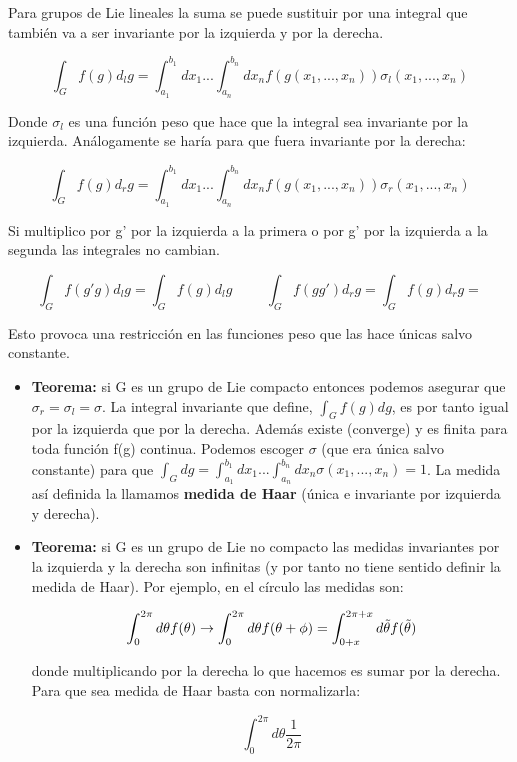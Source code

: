 \documentclass{article}
\begin{document}
     Para grupos de Lie lineales la suma se puede sustituir por una integral que también va a ser invariante por la izquierda y por la derecha.

     $$\int _G f(g)d_lg=\int ^{b_1}_{a_1} dx_1...\int ^{b_n}_{a_n} dx_n f(g(x_1,...,x_n))\sigma _l(x_1,...,x_n)$$

     Donde $\sigma _l$ es una función peso que hace que la integral sea invariante por la izquierda. Análogamente se haría para que fuera invariante por la derecha:

     $$\int _G f(g)d_rg=\int ^{b_1}_{a_1} dx_1...\int ^{b_n}_{a_n} dx_n f(g(x_1,...,x_n))\sigma _r(x_1,...,x_n)$$

     Si multiplico por g' por la izquierda a la primera o por g' por la izquierda a la segunda las integrales no cambian.

     $$\int _G f(g'g)d_lg=\int _G f(g)d_lg \hspace{1cm} \int _G f(gg')d_rg=\int _G f(g)d_rg=$$

     Esto provoca una restricción en las funciones peso que las hace únicas salvo constante.

     \bigskip
     \begin{itemize}
         \item      \textbf{Teorema:} si G es un grupo de Lie compacto entonces podemos asegurar que $\sigma _r=\sigma_l=\sigma$. La integral invariante que define, $\int _G f(g)d g$, es por tanto igual por la izquierda que por la derecha. Además existe (converge) y es finita para toda función f(g) continua. Podemos escoger $\sigma$ (que era única salvo constante) para que $\int _G dg=\int ^{b_1}_{a_1} dx_1...\int ^{b_n}_{a_n} dx_n \sigma (x_1,...,x_n)=1$. La medida así definida la llamamos \textbf{medida de Haar} (única e invariante por izquierda y derecha).

         \item \textbf{Teorema:} si G es un grupo de Lie no compacto las medidas invariantes por la izquierda y la derecha son infinitas (y por tanto no tiene sentido definir la medida de Haar). Por ejemplo, en el círculo las medidas son:

         $$\int ^{2\pi}_0 d\theta f(\theta) \to \int ^{2\pi}_0 d\theta f(\theta +\phi)= \int ^{2\pi + x}_{0+x} d\Tilde{\theta} f(\Tilde{\theta})$$

         donde multiplicando por la derecha lo que hacemos es sumar por la derecha. Para que sea medida de Haar basta con normalizarla:

         $$\int ^{2\pi}_0 d \theta \frac{1}{2\pi}$$

     \end{itemize}
\end{document}
